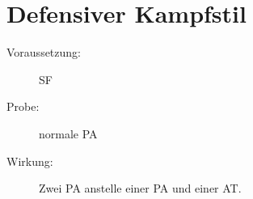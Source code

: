 \section{Defensiver Kampfstil}
\label{bPA.defensiver_kampfstil}
\begin{description}
    \item[Voraussetzung:]
        SF 
    \item[Probe:]
        normale PA
    \item[Wirkung:]
        Zwei PA anstelle einer PA und einer AT.
\end{description}
